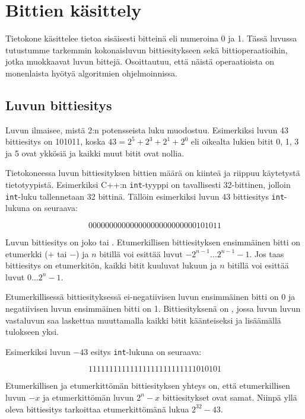 \chapter{Bittien käsittely}

Tietokone käsittelee tietoa sisäisesti bitteinä
eli numeroina 0 ja 1.
Tässä luvussa tutustumme tarkemmin kokonaisluvun
bittiesitykseen sekä bittioperaatioihin,
jotka muokkaavat luvun bittejä.
Osoittautuu, että näistä operaatioista on
monenlaista hyötyä algoritmien ohjelmoinnissa.

\section{Luvun bittiesitys}


Luvun  ilmaisee, mistä 2:n potensseista
luku muodostuu. Esimerkiksi luvun 43 bittiesitys on 101011, koska
$43 = 2^5 + 2^3 + 2^1 + 2^0$
eli oikealta lukien bitit 0, 1, 3 ja 5 ovat ykkösiä
ja kaikki muut bitit ovat nollia.

Tietokoneessa luvun bittiesityksen
bittien määrä on kiinteä ja riippuu käytetystä tietotyypistä.
Esimerkiksi C++:n \texttt{int}-tyyppi on tavallisesti 32-bittinen,
jolloin \texttt{int}-luku tallennetaan 32 bittinä.
Tällöin esimerkiksi luvun 43 bittiesitys \texttt{int}-lukuna on seuraava:

\[00000000000000000000000000101011\]

Luvun bittiesitys on joko 
tai .
Etumerkillisen bittiesityksen ensimmäinen bitti on etumerkki
($+$ tai $-$) ja $n$ bitillä voi esittää luvut $-2^{n-1} \ldots 2^{n-1}-1$.
Jos taas bittiesitys on etumerkitön,
kaikki bitit kuuluvat lukuun ja $n$ bitillä voi esittää luvut $0 \ldots 2^n-1$.

Etumerkillisessä bittiesityksessä ei-negatiivisen luvun
ensimmäinen bitti on 0 ja negatiivisen luvun
ensimmäinen bitti on 1.
Bittiesityksenä on ,
jossa luvun luvun vastaluvun saa laskettua
muuttamalla
kaikki bitit käänteiseksi ja lisäämällä
tulokseen yksi.

Esimerkiksi luvun $-43$ esitys \texttt{int}-lukuna on seuraava:

\[11111111111111111111111111010101\]

Etumerkillisen ja etumerkittömän bittiesityksen
yhteys on, että etumerkillisen luvun $-x$
ja etumerkittömän luvun $2^n-x$ bittiesitykset ovat samat.
Niinpä yllä oleva bittiesitys tarkoittaa
etumerkittömänä lukua $2^{32}-43$.

